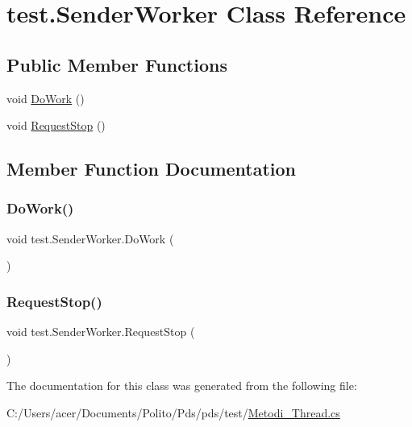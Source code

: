 \hypertarget{classtest_1_1_sender_worker}{}\section{test.\+Sender\+Worker Class Reference}
\label{classtest_1_1_sender_worker}
\subsection*{Public Member Functions}
\begin{DoxyCompactItemize}
\item 
void \hyperlink{classtest_1_1_sender_worker_a0193517e06f94db5d9c4a148c1a5c318}{Do\+Work} ()
\item 
void \hyperlink{classtest_1_1_sender_worker_aa1132b6f9146b1c4552b9fe52e552108}{Request\+Stop} ()
\end{DoxyCompactItemize}


\subsection{Member Function Documentation}
\mbox{\label{classtest_1_1_sender_worker_a0193517e06f94db5d9c4a148c1a5c318}} 
\subsubsection{\texorpdfstring{Do\+Work()}{DoWork()}}
{\footnotesize\ttfamily void test.\+Sender\+Worker.\+Do\+Work (\begin{DoxyParamCaption}{ }\end{DoxyParamCaption})}

\mbox{\label{classtest_1_1_sender_worker_aa1132b6f9146b1c4552b9fe52e552108}} 
\subsubsection{\texorpdfstring{Request\+Stop()}{RequestStop()}}
{\footnotesize\ttfamily void test.\+Sender\+Worker.\+Request\+Stop (\begin{DoxyParamCaption}{ }\end{DoxyParamCaption})}



The documentation for this class was generated from the following file\+:\begin{DoxyCompactItemize}
\item 
C\+:/\+Users/acer/\+Documents/\+Polito/\+Pds/pds/test/\hyperlink{_metodi___thread_8cs}{Metodi\+\_\+\+Thread.\+cs}\end{DoxyCompactItemize}
